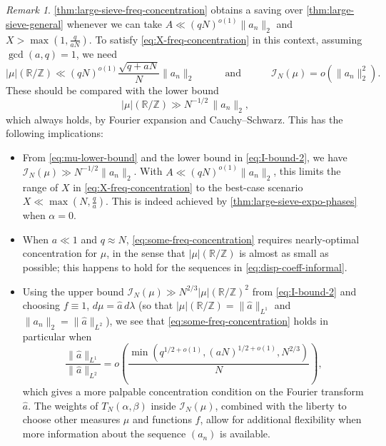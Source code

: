 \documentclass[reqno,11pt]{amsart}
\theoremstyle{remark}
\newtheorem*{remark}{Remark}
\numberwithin{equation}{section}
\newcommand{\Z}{\mathbb{Z}}
\newcommand{\R}{\mathbb{R}}
\newcommand{\mI}{\mathcal{I}}
\renewcommand{\hat}{\widehat}
\begin{document}
\begin{remark}
\cref{thm:large-sieve-freq-concentration} obtains a saving over \cref{thm:large-sieve-general} whenever we can take $A \ll (qN)^{o(1)}\|a_n\|_2$ and $X > \max(1, \tfrac{q}{aN})$. To satisfy \cref{eq:X-freq-concentration} in this context, assuming $\gcd(a, q) = 1$, we need
\begin{equation} \label{eq:some-freq-concentration}
    |\mu|(\R/\Z) 
    \ll 
    (qN)^{o(1)} \frac{\sqrt{q+aN}}{N} \|a_n\|_2
    \qquad\quad 
    \text{and}
    \qquad\quad
    \mI_N(\mu) = o\left(\|a_n\|_2^2\right).
\end{equation}
These should be compared with the lower bound
\begin{equation} \label{eq:mu-lower-bound}
    |\mu|(\R/\Z) \gg N^{-1/2}\, \|a_n\|_2,
\end{equation}
which always holds, by Fourier expansion and Cauchy--Schwarz.
This has the following implications:
\begin{itemize}
    \item[(1).] From \cref{eq:mu-lower-bound} and the lower bound in \cref{eq:I-bound-2}, we have $\mI_N(\mu) \gg N^{-1/2} \|a_n\|_2$. With $A \ll (qN)^{o(1)}\|a_n\|_2$, this limits the range of $X$ in \cref{eq:X-freq-concentration} to the best-case scenario $X \ll \max(N, \tfrac{q}{a})$. This is indeed achieved by \cref{thm:large-sieve-expo-phases} when $\alpha = 0$.
    \item[(2).] When $a \ll 1$ and $q \approx N$, \cref{eq:some-freq-concentration} requires nearly-optimal concentration for $\mu$, in the sense that $|\mu|(\R/\Z)$ is almost as small as possible; this happens to hold for the sequences in \cref{eq:disp-coeff-informal}.
    \item[(3).] Using the upper bound $\mI_N(\mu) \gg N^{2/3}|\mu|(\R/\Z)^2$ from \cref{eq:I-bound-2} and choosing $f \equiv 1$, $d\mu = \hat{a}\, d\lambda$ (so that $|\mu|(\R/\Z) = \|\hat{a}\|_{L^1}$ and $\|a_n\|_2 = \|\hat{a}\|_{L^2}$), we see that \cref{eq:some-freq-concentration} holds in particular when
    \[
        \frac{\|\hat{a}\|_{L^1}}{\|\hat{a}\|_{L^2}} = o\left(\frac{\min(q^{1/2+o(1)}, (aN)^{1/2+o(1)}, N^{2/3})}{N}\right),
    \]
    which gives a more palpable concentration condition on the Fourier transform $\hat{a}$. The weights of $T_N(\alpha, \beta)$ inside $\mI_N(\mu)$, combined with the liberty to choose other measures $\mu$ and functions $f$, allow for additional flexibility when more information about the sequence $(a_n)$ is available. 
\end{itemize}
\end{remark}
\end{document}
